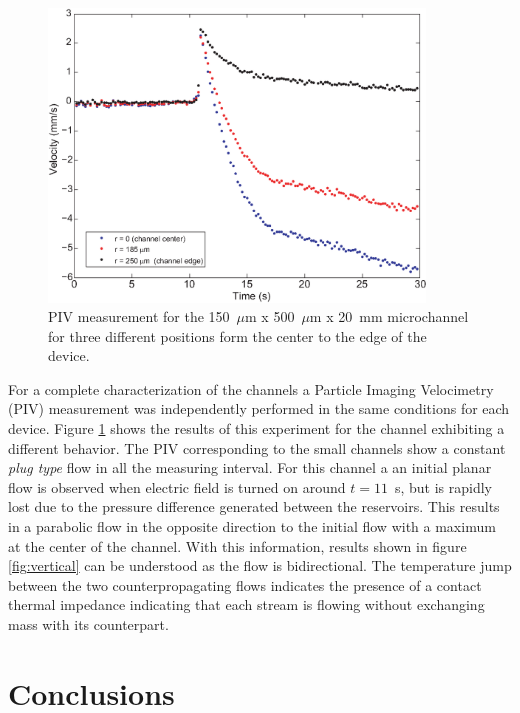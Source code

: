 \documentclass[]{spie}  %
\newcommand{\figsimple}{10cm} %
\begin{document}
\begin{figure}[h!t!b!]
\centering
\includegraphics[width=\figsimple]{figs/fig5.eps}
\caption{PIV measurement for the 150~$\mu$m x 500~$\mu$m x 20~mm microchannel for three different positions form the center to the edge of the device. \label{fig:piv}}
\end{figure}
For a complete characterization of the channels a Particle Imaging Velocimetry (PIV) measurement was independently performed in the same conditions for each device. Figure \ref{fig:piv} shows the results of this experiment for the channel exhibiting a different behavior. The PIV corresponding to the small channels show a constant \textit{plug type} flow in all the measuring interval. For this channel a an initial planar flow is observed when electric field is turned on around $t = 11$~s, but is rapidly lost due to the pressure difference generated between the reservoirs. This results in a parabolic flow in the opposite direction to the initial flow with a maximum at the center of the channel. With this information, results shown in figure \ref{fig:vertical} can be understood as the flow is bidirectional. The temperature jump between the two counterpropagating flows indicates the presence of a contact thermal impedance indicating that each stream is flowing without exchanging mass with its counterpart. 




\section{Conclusions}
\end{document}
